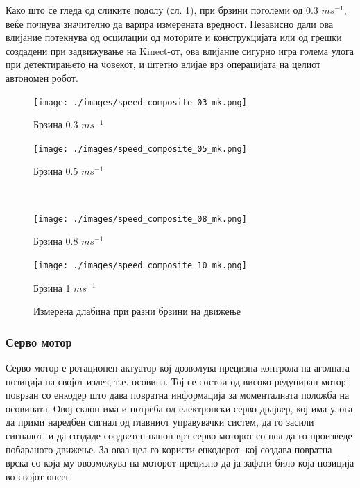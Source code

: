 \documentclass[11pt]{article}
\begin{document}
      Како што се гледа од сликите подолу (сл. \ref{fig:composites}), при брзини поголеми од 0.3 $ms^{-1}$, веќе почнува значително да варира измерената вредност. Независно дали ова влијание потекнува од  осцилации од моторите и конструкцијата или од грешки создадени при задвижување на Kinect-от, ова влијание сигурно игра голема улога при детектирањето на човекот, и штетно влијае врз операцијата на целиот автономен робот.
      \newpage
      \hfill
      \begin{figure}[H]
        \begin{minipage}{0.5\linewidth}
          \centering
          \texttt{[image: ./images/speed\_composite\_03\_mk.png]}
          \caption{Брзина 0.3 $ms^{-1}$}
        \end{minipage}
        \begin{minipage}{0.5\linewidth}
          \centering
          \texttt{[image: ./images/speed\_composite\_05\_mk.png]}
          \caption{Брзина 0.5 $ms^{-1}$}
        \end{minipage}
        \\
        \begin{minipage}{0.5\linewidth}
          \centering
          \texttt{[image: ./images/speed\_composite\_08\_mk.png]}
          \caption{Брзина 0.8 $ms^{-1}$}
        \end{minipage}
        \begin{minipage}{0.5\linewidth}
          \centering
          \texttt{[image: ./images/speed\_composite\_10\_mk.png]}
          \caption{Брзина 1 $ms^{-1}$}
        \end{minipage}
        \caption{Измерена длабина при разни брзини на движење}
        \label{fig:composites}
      \end{figure}

    \subsubsection{Серво мотор}
      Серво мотор е ротационен актуатор кој дозволува прецизна контрола на аголната позиција на својот излез, т.е. осовина. Тој се состои од високо редуциран мотор поврзан со енкодер што дава повратна информација за моменталната положба на осовината. Овој склоп има и потреба од електронски серво драјвер, кој има улога да прими наредбен сигнал од главниот управувачки систем, да го засили сигналот, и да создаде соодветен напон врз серво моторот со цел да го произведе побараното движење. За оваа цел го користи енкодерот, кој создава повратна врска со која му овозможува на моторот прецизно да ја зафати било која позиција во својот опсег.
\end{document}
